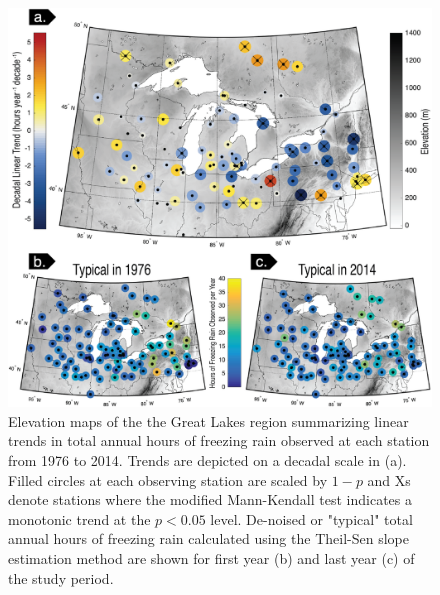 \documentclass[twocol]{ametsoc}
\begin{document}
\begin{figure}
\centering
\includegraphics[width=1.0\textwidth]{FZRA_Trend_Maps.png}
\caption{\label{fig:trendmap}Elevation maps of the the Great Lakes region summarizing linear trends in total annual hours of freezing rain observed at each station from 1976 to 2014. Trends are depicted on a decadal scale in (a). Filled circles at each observing station are scaled by $1 - p$ and Xs denote stations where the modified Mann-Kendall test indicates a monotonic trend at the $p<0.05$ level. De-noised or "typical" total annual hours of freezing rain calculated using the Theil-Sen slope estimation method are shown for first year (b) and last year (c) of the study period.}
\end{figure}
\end{document}
